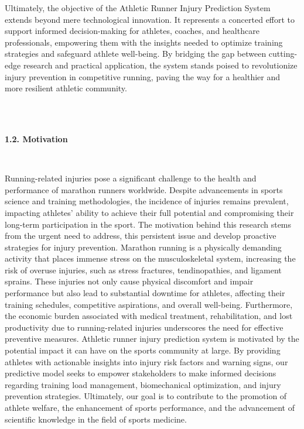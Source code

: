 \documentclass[12pt, English]{article}
\newcommand\tab[1][1cm]{\hspace*{#1}}
\begin{document}
\begin{normalsize}
\begin{normalsize}
\tab Ultimately, the objective of the Athletic Runner Injury Prediction System extends beyond mere technological innovation. It represents a concerted effort to support informed decision-making for athletes, coaches, and healthcare professionals, empowering them with the insights needed to optimize training strategies and safeguard athlete well-being. By bridging the gap between cutting-edge research and practical application, the system stands poised to revolutionize injury prevention in competitive running, paving the way for a healthier and more resilient athletic community.
\end{normalsize}
\\\\
\begin{large}
\textbf{1.2. Motivation}
\end{large}
\\
\begin{normalsize}
    \tab Running-related injuries pose a significant challenge to the health and performance of marathon runners worldwide. Despite advancements in sports science and training methodologies, the incidence of injuries remains prevalent, impacting athletes’ ability to achieve their full potential and compromising their long-term participation in the sport. The motivation behind this research stems from the urgent need to address, this persistent issue and develop proactive strategies for injury prevention. Marathon running is a physically demanding activity that places immense stress on the musculoskeletal system, increasing the risk of overuse injuries, such as stress fractures, tendinopathies, and ligament sprains. These injuries not only cause physical discomfort and impair performance but also lead to substantial downtime for athletes, affecting their training schedules, competitive aspirations, and overall well-being. Furthermore, the economic burden associated with medical treatment, rehabilitation, and lost productivity due to running-related injuries underscores the need for effective preventive measures. Athletic runner injury prediction system is motivated by the potential impact it can have on the sports community at large. By providing athletes with actionable insights into injury risk factors and warning signs, our predictive model seeks to empower stakeholders to make informed decisions regarding training load management, biomechanical optimization, and injury prevention strategies. Ultimately, our goal is to contribute to the promotion of athlete welfare, the enhancement of sports performance, and the advancement of scientific knowledge in the field of sports medicine.

\end{normalsize}
\end{normalsize}
\end{document}
